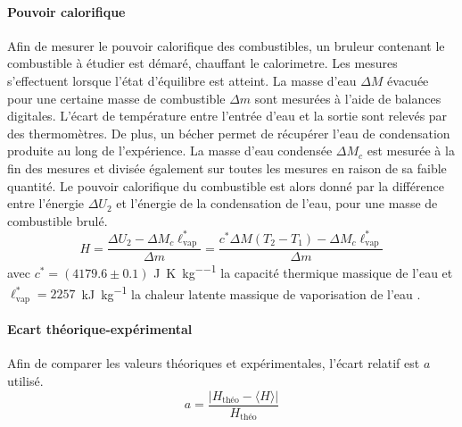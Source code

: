 \paragraph*{Pouvoir calorifique}
Afin de mesurer le pouvoir calorifique des combustibles, un bruleur contenant le combustible à étudier est démaré, chauffant le calorimetre. Les mesures s'effectuent lorsque l'état d'équilibre est atteint. La masse d'eau \(\Delta M\) évacuée pour une certaine masse de combustible \(\Delta m\) sont mesurées à l'aide de balances digitales. L'écart de température entre l'entrée d'eau et la sortie sont relevés par des thermomètres. De plus, un bécher permet de récupérer l'eau de condensation produite au long de l'expérience. La masse d'eau condensée \(\Delta M_c\) est mesurée à la fin des mesures et divisée également sur toutes les mesures en raison de sa faible quantité. Le pouvoir calorifique du combustible est alors donné par la différence entre l'énergie \(\Delta U_2\) et l'énergie de la condensation de l'eau, pour une masse de combustible brulé.
\begin{equation}
    H = \frac{\Delta U_2 - \Delta M_c \ell_\textrm{vap}^*}{\Delta m} = \frac{c^* \Delta M (T_2 - T_1) - \Delta M_c \ell_\textrm{vap}^*}{\Delta m}
    \label{eq:pouvoir_calorifique}
\end{equation}
avec \(c^* = (4179.6 \pm 0.1)\) \si{\joule\per\kelvin\per\kilo\gram} la capacité thermique massique de l'eau \cite{capacite-eau} et \mbox{\(\ell_\textrm{vap}^* = 2257\) \si{\kilo\joule\per\kilo\gram}} la chaleur latente massique de vaporisation de l'eau \cite{notice}.

\paragraph*{Ecart théorique-expérimental}
Afin de comparer les valeurs théoriques et expérimentales, l'écart relatif est \(a\) utilisé.
\begin{equation}
    a = \frac{ |H_\textrm{théo} - \langle H \rangle| }{ H_\textrm{théo} }
    \label{eq:ecart_rel}
\end{equation}
